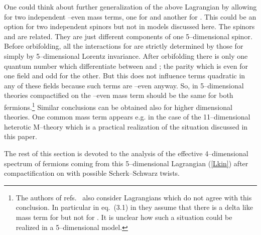 \documentclass[a4paper,12pt]{article}
\def\ZZ{\mathbb Z}
\begin{document}
One could think about further generalization of the above Lagrangian
by allowing for two independent \myHighlight{$\ZZ_2$}\coordHE{}--even mass terms, one for
\coordHE{} and another for \coordHE{}. This could be an option for
two independent spinors \coordHE{} but not in models discussed here. The
spinors \coordHE{} and \coordHE{} are related. They are just
different components of one 5--dimensional spinor. Before orbifolding,
all the interactions for \coordHE{} are strictly determined by those for
\coordHE{} simply by 5--dimensional Lorentz invariance. After
orbifolding there is only one quantum number which differentiate
between \coordHE{} and \coordHE{}; the \myHighlight{$\ZZ_2$}\coordHE{} parity which is even for
one field and odd for the other. But this does not influence terms
quadratic in any of these fields because such terms are \myHighlight{$\ZZ_2$}\coordHE{}--even
anyway. So, in 5--dimensional theories compactified on \myHighlight{$S^1/\ZZ_2$}\coordHE{} the
\myHighlight{$\ZZ_2$}\coordHE{}--even mass term \coordHE{} should be the same for both 
fermions.\footnote{
The authors of refs.\ \cite{Bagger:2001qi,Bagger:2001ep} also consider 
Lagrangians which do not agree with this conclusion. In particular in
eq.\ (3.1) in \cite{Bagger:2001ep} they assume that there is a delta
like mass term for \coordHE{} but not for \coordHE{}. It is unclear how
such a situation could be realized in a 5--dimensional model.
}
Similar conclusions can be obtained also for higher dimensional
theories. One common \coordHE{} mass term appears e.g. in the case of the
11--dimensional heterotic M--theory \cite{Meissner:1999ja} which is a
practical realization of the situation discussed in this paper.


The rest of this section is devoted to the analysis of the effective
4--dimensional spectrum of fermions coming from this 5--dimensional
Lagrangian (\ref{Lkin}) after compactification on \myHighlight{$S^1/\ZZ_2$}\coordHE{} with
possible Scherk--Schwarz twists.
\end{document}
